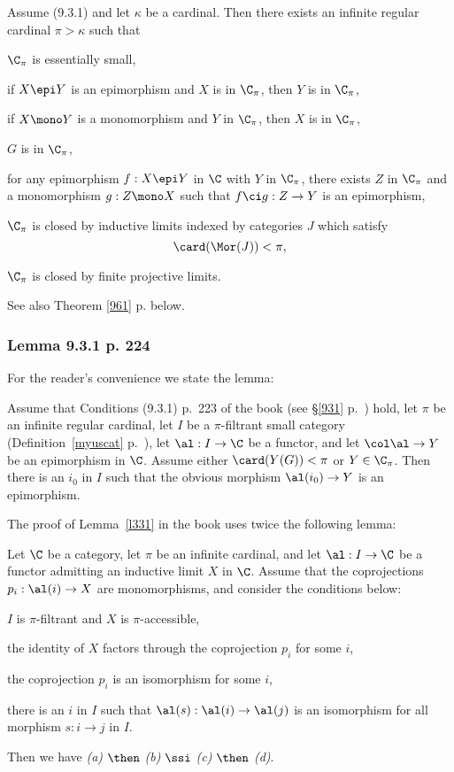 \documentclass[12pt]{article}
\theoremstyle{remark}
\theoremstyle{definition}
\begin{document}
\begin{cor}[Corollary 9.3.8 p.~227]
Assume (9.3.1) and let $\kappa$ be a cardinal. Then there exists an infinite regular cardinal $\pi>\kappa$ such that 

 $\C_\pi$ is essentially small,

 if $X\epi Y$ is an epimorphism and $X$ is in $\C_\pi$, then $Y$ is in $\C_\pi$,

 if $X\mono Y$ is a monomorphism and $Y$ in $\C_\pi$, then $X$ is in $\C_\pi$,

 $G$ is in $\C_\pi$,

 for any epimorphism $f:X\epi Y$ in $\C$ with $Y$ in $\C_\pi$, there exists $Z$ in $\C_\pi$ and a monomorphism $g:Z\mono X$ such that $f\ci g:Z\to Y$ is an epimorphism,

 $\C_\pi$ is closed by inductive limits indexed by categories $J$ which satisfy $$\card(\Mor(J))<\pi,$$

 $\C_\pi$ is closed by finite projective limits.
\end{cor}

See also Theorem \ref{961} p.  below.

%

\subsubsection{Lemma 9.3.1 p. 224}

For the reader's convenience we state the lemma:

\begin{lem}[Lemma 9.3.1 p. 224]
Assume that Conditions (9.3.1) p.~223 of the book (see \S\ref{931} p.~) hold, let $\pi$ be an infinite regular cardinal, let $I$ be a $\pi$-filtrant small category (Definition~\ref{myuscat} p.~), let $\al:I\to\C$ be a functor, and let $\col\al\to Y$ be an epimorphism in $\C$. Assume either $\card(Y(G))<\pi$ or $Y\in\C_\pi$. Then there is an $i_0$ in $I$ such that the obvious morphism $\al(i_0)\to Y$ is an epimorphism.
\end{lem}

The proof of Lemma~\ref{l331} in the book uses twice the following lemma:

\begin{lem} 
Let $\C$ be a category, let $\pi$ be an infinite cardinal, and let $\al:I\to\C$ be a functor admitting an inductive limit $X$ in $\C$. Assume that the coprojections $p_i:\al(i)\to X$ are monomorphisms, and consider the conditions below:

 $I$ is $\pi$-filtrant and $X$ is $\pi$-accessible,

 the identity of $X$ factors through the coprojection $p_i$ for some $i$,

 the coprojection $p_i$ is an isomorphism for some $i$,

 there is an $i$ in $I$ such that $\al(s):\al(i)\to\al(j)$ is an isomorphism for all morphism $s:i\to j$ in $I$.

\nn Then we have {\em(a)} $\then$ {\em(b)} $\ssi$ {\em(c)} $\then$ {\em(d)}. 
\end{lem}
\end{document}
